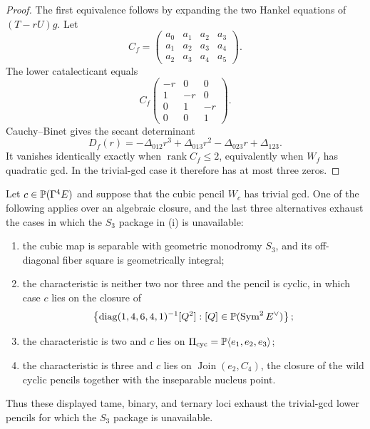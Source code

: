 \begin{proof}
The first equivalence follows by expanding the two Hankel equations of
$(T-rU)g$.  Let
\[
C_f=\begin{pmatrix}
a_0&a_1&a_2&a_3\\
a_1&a_2&a_3&a_4\\
a_2&a_3&a_4&a_5
\end{pmatrix}.
\]
The lower catalecticant equals
\[
C_f\begin{pmatrix}
-r&0&0\\1&-r&0\\0&1&-r\\0&0&1
\end{pmatrix}.
\]
Cauchy--Binet gives the secant determinant
\[
D_f(r)=-\Delta_{012}r^3+\Delta_{013}r^2
       -\Delta_{023}r+\Delta_{123}.
\]
It vanishes identically exactly when $\operatorname{rank}C_f\leq2$,
equivalently when $W_f$ has quadratic gcd.  In the trivial-gcd case it
therefore has at most three zeros.
\end{proof}

\begin{proposition}
\label{prop:r6-lower-carrier}%
%
Let \(c\in\mathbb P(\Gamma^4E)\) and suppose that the cubic pencil \(W_c\)
has trivial gcd.  One of the following applies over an algebraic
closure, and the last three alternatives exhaust the cases in which
the \(S_3\) package in (i) is unavailable:
\begin{enumerate}[label=\textup{(\roman*)}]
\item the cubic map is separable with geometric monodromy \(S_3\), and
      its off-diagonal fiber square is geometrically integral;
\item the characteristic is neither two nor three and the pencil is cyclic, in
      which case \(c\) lies on the closure of
      \[
      \left\{\operatorname{diag}(1,4,6,4,1)^{-1}[Q^2]:
      [Q]\in\mathbb P(\operatorname{Sym}^2E^\vee)\right\};
      \]
\item the characteristic is two and \(c\) lies on
      \(\Pi_{\mathrm{cyc}}=\mathbb P\langle e_1,e_2,e_3\rangle\);
\item the characteristic is three and \(c\) lies on
      \(\operatorname{Join}(e_2,C_4)\), the closure of the wild cyclic
      pencils together with the inseparable nucleus point.
\end{enumerate}
Thus these displayed tame, binary, and ternary loci exhaust the
trivial-gcd lower pencils for which the \(S_3\) package is unavailable.
\end{proposition}

